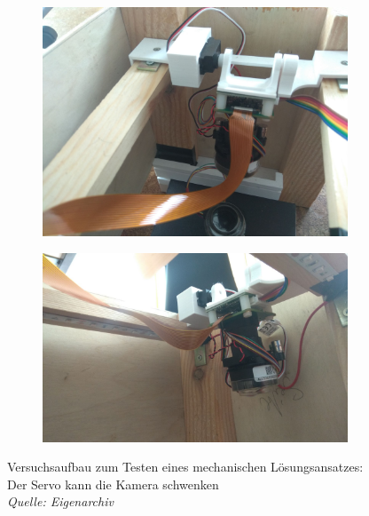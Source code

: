 \documentclass[11pt,a4paper]{article}
\begin{document}
\begin{figure}[H] \label{fig:mechanics-test}
    \centering
    \begin{subfigure}{.49\textwidth}
        \includegraphics[height=.2\textheight]{images/mechanics_test_1.jpg}
    \end{subfigure}
    \begin{subfigure}{.49\textwidth}
        \includegraphics[height=.2\textheight]{images/mechanics_test_2.jpg}
    \end{subfigure}
    \caption{Versuchsaufbau zum Testen eines mechanischen Lösungsansatzes: Der Servo kann die Kamera schwenken \\
    \textit{Quelle: Eigenarchiv}}
\end{figure}
\end{document}
